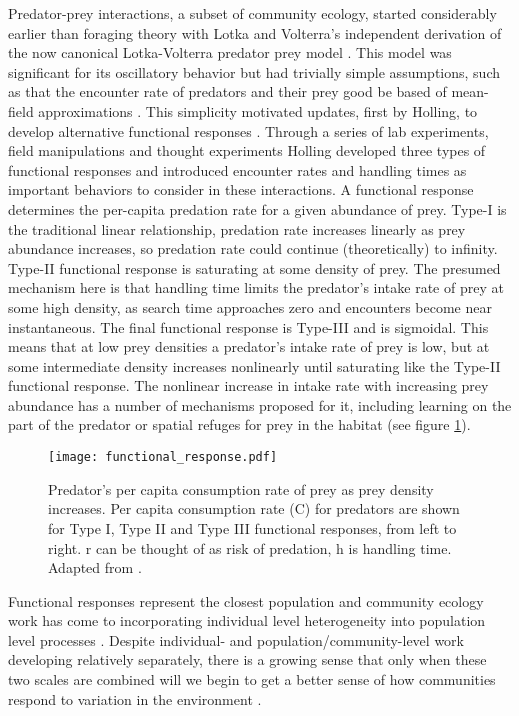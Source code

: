 \documentclass[12pt,a4paper]{report}
\begin{document}
Predator-prey interactions, a subset of community ecology,  started considerably earlier than foraging theory with Lotka and Volterra's independent derivation of the now canonical Lotka-Volterra predator prey model \citep{Volterra:1928, Lotka:1925}. This model was significant for its oscillatory behavior but had trivially simple assumptions, such as that the encounter rate of predators and their prey good be based of mean-field approximations \citep{Lawetal:2000, Gurarieetal:2013}. This simplicity motivated updates, first by Holling, to develop alternative functional responses \citep{Holling:1959}. Through a series of lab experiments, field manipulations and thought experiments Holling developed three types of functional responses and introduced encounter rates and handling times as important behaviors to consider in these interactions. A functional response determines the per-capita predation rate for a given abundance of prey. Type-I is the traditional linear relationship, predation rate increases linearly as prey abundance increases, so predation rate could continue (theoretically) to infinity.  Type-II functional response is saturating at some density of prey. The presumed mechanism here is that handling time limits the predator's intake rate of prey at some high density, as search time approaches zero and encounters become near instantaneous. The final functional response is Type-III and is sigmoidal. This means that at low prey densities a predator's intake rate of prey is low, but at some intermediate density increases nonlinearly until saturating like the Type-II functional response. The nonlinear increase in intake rate with increasing prey abundance has a number of mechanisms proposed for it, including learning on the part of the predator or spatial refuges for prey in the habitat (see figure \ref{functional response}). 

\begin{figure}
\centering
\texttt{[image: functional\_response.pdf]}
\caption{\small Predator's per capita consumption rate of prey as prey density increases. Per capita consumption rate (C) for predators are shown for Type I, Type II and Type III functional responses, from left to right. r can be thought of as risk of predation, h is handling time. Adapted from \cite{DennoLewis:2009}. \label{functional response}}
\end{figure}

Functional responses represent the closest population and community ecology work has come to incorporating individual level heterogeneity into population level processes \citep{Fryxelletal:2007}. Despite individual- and population/community-level work developing relatively separately, there is a growing sense that only when these two scales are combined will we begin to get a better sense of how communities respond to variation in the environment \citep{Bolnicketal:2011}.
\end{document}
